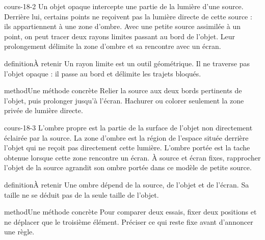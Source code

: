 \documentclass[12pt,twoside,openany]{book}
\begin{document}
\begin{pcFiche}{cours-18-2}
Un objet opaque intercepte une partie de la lumière d’une source. Derrière lui, certains points ne reçoivent pas la lumière directe de cette source : ils appartiennent à une zone d’ombre. Avec une petite source assimilée à un point, on peut tracer deux rayons limites passant au bord de l’objet. Leur prolongement délimite la zone d’ombre et sa rencontre avec un écran.\par
{}
\begin{pcEncadre}{definition}{À retenir}
Un rayon limite est un outil géométrique. Il ne traverse pas l’objet opaque : il passe au bord et délimite les trajets bloqués.\par
\end{pcEncadre}
\begin{pcEncadre}{method}{Une méthode concrète}
Relier la source aux deux bords pertinents de l’objet, puis prolonger jusqu’à l’écran. Hachurer ou colorer seulement la zone privée de lumière directe.\par
\end{pcEncadre}
\end{pcFiche}
\label{ch-18-cours-3}
\begin{pcFiche}{cours-18-3}
L’ombre propre est la partie de la surface de l’objet non directement éclairée par la source. La zone d’ombre est la région de l’espace située derrière l’objet qui ne reçoit pas directement cette lumière. L’ombre portée est la tache obtenue lorsque cette zone rencontre un écran. À source et écran fixes, rapprocher l’objet de la source agrandit son ombre portée dans ce modèle de petite source.\par
{}
\begin{pcEncadre}{definition}{À retenir}
Une ombre dépend de la source, de l’objet et de l’écran. Sa taille ne se déduit pas de la seule taille de l’objet.\par
\end{pcEncadre}
\begin{pcEncadre}{method}{Une méthode concrète}
Pour comparer deux essais, fixer deux positions et ne déplacer que le troisième élément. Préciser ce qui reste fixe avant d’annoncer une règle.\par
\end{pcEncadre}
\end{pcFiche}
\end{document}
